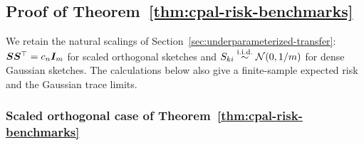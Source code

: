 \documentclass{article}
\theoremstyle{plain} %
\theoremstyle{definition} %
\theoremstyle{definition} %
\begin{document}
\subsection{Proof of Theorem~\ref{thm:cpal-risk-benchmarks}}
\label{app:concrete-underparameterized-proofs}

We retain the natural scalings of Section~\ref{sec:underparameterized-transfer}:
$\boldsymbol{S}\boldsymbol{S}^\top=c_n\boldsymbol{I}_m$ for scaled orthogonal sketches and
$S_{ki}\stackrel{\mathrm{i.i.d.}}{\sim}{\mathcal N}(0,1/m)$ for dense Gaussian
sketches. The calculations below also give a finite-sample expected risk
and the Gaussian trace limits.

\subsubsection{Scaled orthogonal case of Theorem~\ref{thm:cpal-risk-benchmarks}}
\label{app:proof-tight-frame-risk}
\end{document}
